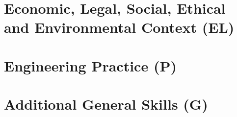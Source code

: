 
\section{Economic, Legal, Social, Ethical and Environmental Context (EL)}



\section{Engineering Practice (P)}



\section{Additional General Skills (G)}